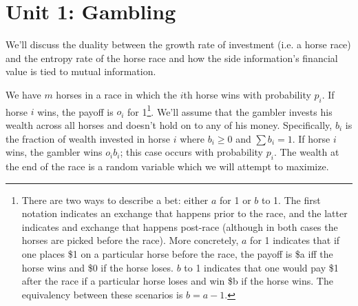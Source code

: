 \documentclass[11pt]{article}
\theoremstyle{definition}
\begin{document}
\title{}
\author{Manan Shah\\ \texttt{manan.shah.777@gmail.com} \\ The Harker School}
\maketitle
\begin{abstract}
This document contains lecture notes from Harker's Advanced Topics in Mathematics class in Information Theory II, taught by Dr. Anuradha Aiyer. This course is the second part of a two part offering that explores the basic concepts of Information Theory, as initially described by Claude Elwood Shannon at Bell Labs in 1948. In Part 2 of the course, we explore other applications of Information Theory to the disciplines of Gambling, Statistics, Physics, Computer science, Economics and Philosophy. These notes were taken using TeXShop and \LaTeX2$\epsilon$ and will be updated for each class. The reader is advised to note any errata at the source control repository \texttt{https://github.com/mananshah99/infotheory}.
\end{abstract}
\tableofcontents
\newpage


\section{Unit 1: Gambling}

We'll discuss the duality between the growth rate of investment (i.e. a horse race) and the entropy rate of the horse race and how the side information's financial value is tied to mutual information. 

 We have $m$ horses in a race in which the $i$th horse wins with probability $p_i$. If horse $i$ wins, the payoff is $o_i$ for 1\footnote{There are two ways to describe a bet: either $a$ for 1 or $b$ to 1. The first notation indicates an exchange that happens prior to the race, and the latter indicates and exchange that happens post-race (although in both cases the horses are picked before the race). More concretely, $a$ for 1 indicates that if one places \$1 on a particular horse before the race, the payoff is \$a iff the horse wins and \$0 if the horse loses. $b$ to 1 indicates that one would pay \$1 after the race if a particular horse loses and win \$b if the horse wins. The equivalency between these scenarios is $b = a-1$.}. We'll assume that the gambler invests his wealth across all horses and doesn't hold on to any of his money. Specifically, $b_i$ is the fraction of wealth invested in horse $i$ where $b_i \geq 0$ and $\sum b_i = 1$. If horse $i$ wins, the gambler wins $o_i b_i$; this case occurs with probability $p_i$. The wealth at the end of the race is a random variable which we will attempt to maximize. 
\end{document}
